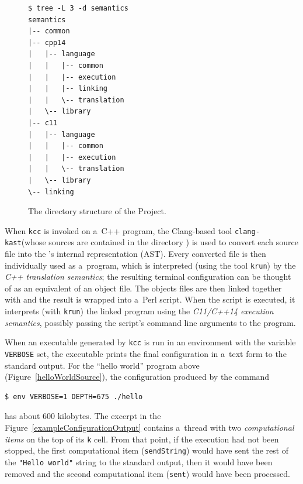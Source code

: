 \documentclass[nolot,nolof,nocover,printed]{fithesis3}
\newcommand{\krun}{\texttt{krun}\xspace}
\newcommand{\clangKast}{\texttt{clang-kast}\xspace}
\newcommand{\kcc}{\texttt{kcc}\xspace}
\newcommand{\Project}{Project\xspace}
\begin{document}
\begin{figure}[ht]
\begin{lstlisting}
$ tree -L 3 -d semantics
semantics
|-- common
|-- cpp14
|   |-- language
|   |   |-- common
|   |   |-- execution
|   |   |-- linking
|   |   \-- translation
|   \-- library
|-- c11
|   |-- language
|   |   |-- common
|   |   |-- execution
|   |   \-- translation
|   \-- library
\-- linking
\end{lstlisting}
\caption{The directory structure of the \Project.}
\label{fig:directoryStructure}
\end{figure}

When \kcc is invoked on a~C++ program, the Clang-based tool \clangKast (whose sources are contained in the directory ) is used to convert each source file into the \K's internal representation (\K AST). Every converted file is then individually used as a~program, which is interpreted (using the \K tool \krun) by the \textit{C++ translation semantics}; the resulting terminal configuration can be thought of as an equivalent of an object file. The objects files are then linked together with and the result is wrapped into a~Perl script. When the script is executed, it interprets (with \krun) the linked program using the \textit{C11/C++14 execution semantics}, possibly passing the script's command line arguments to the program.



When an executable generated by \kcc is run in an environment with the variable \lstinline|VERBOSE| set, the executable prints the final configuration in a~text form to the standard output. For the \enquote{hello world} program above (Figure~\ref{helloWorldSource}), the configuration produced by
the command
\begin{lstlisting}
$ env VERBOSE=1 DEPTH=675 ./hello
\end{lstlisting}
has about 600 kilobytes. The excerpt in the Figure~\ref{exampleConfigurationOutput} contains a~thread with two \textit{computational items} on the top of its \lstinline|k| cell. From that point, if the execution had not been stopped, the first computational item (\lstinline|sendString|) would have sent the rest of the \lstinline|"Hello world"| string to the standard output, then it would have been removed and the second computational item (\lstinline|sent|) would have been processed.
\end{document}
